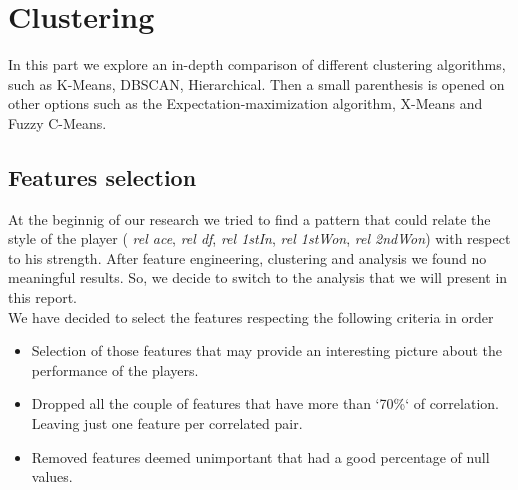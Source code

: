 \section{Clustering}
In this part we explore an in-depth comparison of different clustering algorithms, such as K-Means, DBSCAN, Hierarchical. Then a small parenthesis is opened on other options such as the Expectation-maximization algorithm, X-Means and Fuzzy C-Means.

\subsection{Features selection}
At the beginnig of our research we tried to find a pattern that could relate the style of the player ( \textit{rel ace},  \textit{rel df},  \textit{rel 1stIn},  \textit{rel 1stWon},  \textit{rel 2ndWon}) with respect to his strength. After feature engineering, clustering and analysis we found no meaningful results. So, we decide to switch to the analysis that we will present in this report.
\\We have decided to select the features respecting the following criteria in order
\begin{itemize}
	\item Selection of those features that may provide an interesting picture about the performance of the players.
	\item Dropped all the couple of features that have more than `70\%` of correlation. Leaving just one feature per correlated pair.
	\item Removed features deemed unimportant that had a good percentage of null values.
\end{itemize}

